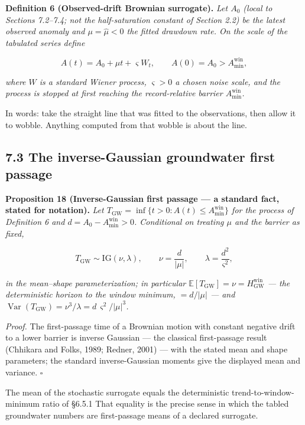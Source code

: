 \documentclass[11pt]{article}
\begin{document}
\textbf{Definition 6 (Observed-drift Brownian surrogate).} \emph{Let \(A_0\) (local to Sections 7.2--7.4; not the half-saturation constant of Section 2.2) be the latest observed anomaly and \(\mu = \widehat\mu < 0\) the fitted drawdown rate. On the scale of the tabulated series define} 

$$A(t) = A_0 + \mu t + \varsigma W_t, \qquad A(0) = A_0 > A_{\min}^{\mathrm{win}},$$

 \emph{where \(W\) is a standard Wiener process, \(\varsigma > 0\) a chosen noise scale, and the process is stopped at first reaching the record-relative barrier \(A_{\min}^{\mathrm{win}}\).}

In words: take the straight line that was fitted to the observations, then allow it to wobble. Anything computed from that wobble is about the line.

\subsection*{7.3 The inverse-Gaussian groundwater first passage}\label{73-the-inverse-gaussian-groundwater-first-passage}

\textbf{Proposition 18 (Inverse-Gaussian first passage --- a standard fact, stated for notation).} \emph{Let \(T_{\mathrm{GW}} =\allowbreak{} \inf\{ t > 0 : A(t) \le A_{\min}^{\mathrm{win}} \}\) for the process of Definition 6 and \(d =\allowbreak{} A_0 - A_{\min}^{\mathrm{win}} > 0\). Conditional on treating \(\mu\) and the barrier as fixed,} 

$$T_{\mathrm{GW}} \sim \mathrm{IG}(\nu, \lambda), \qquad \nu = \frac{d}{|\mu|}, \qquad \lambda = \frac{d^2}{\varsigma^2},$$

 \emph{in the mean--shape parameterization; in particular \(\mathbb{E}[T_{\mathrm{GW}}] =\allowbreak{} \nu =\allowbreak{} H^{\mathrm{win}}_{\mathrm{GW}}\) --- the deterministic horizon to the window minimum, \(= d/|\mu|\) --- and \(\operatorname{Var}(T_{\mathrm{GW}}) =\allowbreak{} \nu^3/\lambda =\allowbreak{} d\,\allowbreak{}\varsigma^2/|\mu|^3\).}

\emph{Proof.} The first-passage time of a Brownian motion with constant negative drift to a lower barrier is inverse Gaussian --- the classical first-passage result (Chhikara and Folks, 1989; Redner, 2001) --- with the stated mean and shape parameters; the standard inverse-Gaussian moments give the displayed mean and variance. \(\square\)

The mean of the stochastic surrogate equals the deterministic trend-to-window-minimum ratio of \S6.5.1 That equality is the precise sense in which the tabled groundwater numbers are first-passage means of a declared surrogate.
\end{document}
